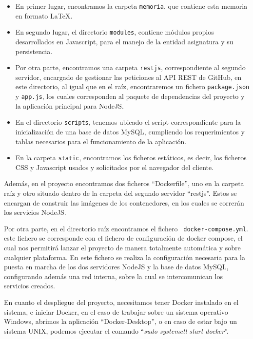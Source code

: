 \begin{itemize}
\item En primer lugar, encontramos la carpeta {\tt memoria}, que contiene
  esta memoria en formato \LaTeX{}.

\item En segundo lugar, el directorio {\tt modules}, contiene módulos propios
  desarrollados en Javascript, para el manejo de la entidad asignatura y su
  persistencia.

\item Por otra parte, encontramos una carpeta {\tt restjs}, correspondiente
  al segundo servidor, encargado de gestionar las peticiones al API REST de
  GitHub, en este directorio, al igual que en el raíz, encontraremos un
  fichero {\tt package.json} y {\tt app.js}, los cuales corresponden al
  paquete de dependencias del proyecto y la aplicación principal para
  NodeJS.

\item En el directorio {\tt scripts}, tenemos ubicado el script
  correspondiente para la inicialización de una base de datos MySQL,
  cumpliendo los requerimientos y tablas necesarios para el funcionamiento
  de la aplicación.

\item En la carpeta {\tt static}, encontramos los ficheros estáticos, es
  decir, los ficheros CSS y Javascript usados y solicitados por el
  navegador del cliente.
\end{itemize}

Además, en el proyecto encontramos dos ficheros ``Dockerfile'', uno en la
carpeta raíz y otro situado dentro de la carpeta del segundo servidor
``restjs''. Estos se encargan de construir las imágenes de los
contenedores, en los cuales se correrán los servicios NodeJS.

Por otra parte, en el directorio raíz encontramos el fichero {\tt
  docker-compose.yml}. este fichero se corresponde con el fichero de
configuración de docker compose, el cual nos permitirá lanzar el proyecto
de manera totalmente automática y sobre cualquier plataforma. En este
fichero se realiza la configuración necesaria para la puesta en marcha de
los dos servidores NodeJS y la base de datos MySQL, configurando además
una red interna, sobre la cual se intercomunican los servicios creados.

En cuanto el despliegue del proyecto, necesitamos tener Docker instalado en
el sistema, e iniciar Docker, en el caso de trabajar sobre un sistema
operativo Windows, abrimos la aplicación
``Docker-Desktop''\cite{DockerDesktop}, o en caso de estar bajo un sistema
UNIX, podemos ejecutar el comando ``\emph{sudo systemctl start docker}''.

